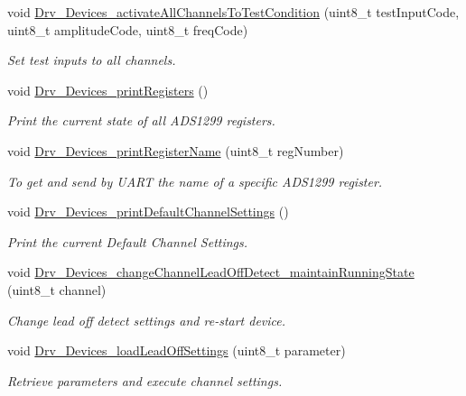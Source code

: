 \begin{DoxyCompactItemize}
void \hyperlink{group___devices___library_ga42ce5be2b197d04b4b0a9918a11ea457}{Drv\+\_\+\+Devices\+\_\+activate\+All\+Channels\+To\+Test\+Condition} (uint8\+\_\+t test\+Input\+Code, uint8\+\_\+t amplitude\+Code, uint8\+\_\+t freq\+Code)
\begin{DoxyCompactList}\small\item\em Set test inputs to all channels. \end{DoxyCompactList}\item 
void \hyperlink{group___devices___library_gad214f99a7d211af8779b46b244f99d99}{Drv\+\_\+\+Devices\+\_\+print\+Registers} ()
\begin{DoxyCompactList}\small\item\em Print the current state of all A\+D\+S1299 registers. \end{DoxyCompactList}\item 
void \hyperlink{group___devices___library_gad85a26f63a893c55cdbbe5c4c0d0e69e}{Drv\+\_\+\+Devices\+\_\+print\+Register\+Name} (uint8\+\_\+t reg\+Number)
\begin{DoxyCompactList}\small\item\em To get and send by U\+A\+R\+T the name of a specific A\+D\+S1299 register. \end{DoxyCompactList}\item 
void \hyperlink{group___devices___library_ga1a1a6145a5269b2a7ebd45abdb53b660}{Drv\+\_\+\+Devices\+\_\+print\+Default\+Channel\+Settings} ()
\begin{DoxyCompactList}\small\item\em Print the current Default Channel Settings. \end{DoxyCompactList}\item 
void \hyperlink{group___devices___library_ga87716766599b761bde56572ccaac7946}{Drv\+\_\+\+Devices\+\_\+change\+Channel\+Lead\+Off\+Detect\+\_\+maintain\+Running\+State} (uint8\+\_\+t channel)
\begin{DoxyCompactList}\small\item\em Change lead off detect settings and re-\/start device. \end{DoxyCompactList}\item 
void \hyperlink{group___devices___library_ga91621cb0b85d8918aa835f198c827379}{Drv\+\_\+\+Devices\+\_\+load\+Lead\+Off\+Settings} (uint8\+\_\+t parameter)
\begin{DoxyCompactList}\small\item\em Retrieve parameters and execute channel settings. \end{DoxyCompactList}\item 

\end{DoxyCompactItemize}

